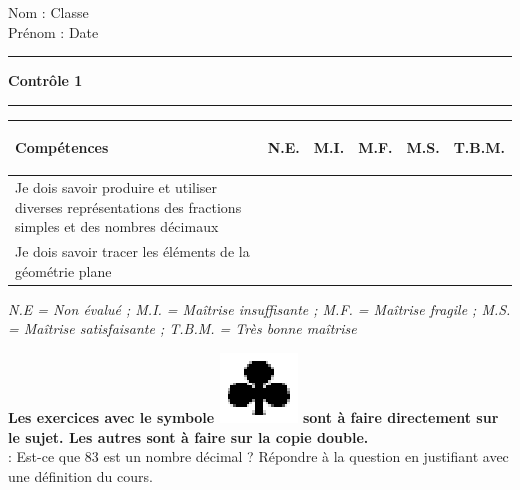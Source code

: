 \documentclass[a4paper,11pt]{article}
\newcounter{numexo}
\newcommand{\exo}[1]{\stepcounter{numexo}\noindent{\bf Exercice~\thenumexo} : \marginpar{\hfill /#1}}
\newcommand{\titre}[5] 
{
\noindent #2 \hfill #4 \\
#3 \hfill #5

\vspace{-1.6cm}

\begin{center}\rule{6cm}{0.5mm}\end{center}
\vspace{0.2cm}
\begin{center}{\large{\textbf{#1}}}\end{center}
\begin{center}\rule{6cm}{0.5mm}\end{center}
}
\begin{document}
\pagestyle{empty}
\titre{Contrôle 1  }{Nom :}{Prénom :}{Classe}{Date}


\vspace*{0.25cm}
\begin{flushleft}
\begin{tabular}{|m{9.5cm}|m{1.25cm}|m{1.25cm}|m{1.25cm}|m{1.25cm}|m{1.25cm}|}
\hline 
\textbf{Compétences} & \begin{center}
\textbf{N.E.}
\end{center} & \begin{center}
\textbf{M.I.}
\end{center} & \begin{center}
\textbf{M.F.}
\end{center}  & \begin{center}
\textbf{M.S.}
\end{center} & \begin{center}
\textbf{T.B.M.}
\end{center} \\ 
\hline 
Je dois savoir produire et utiliser diverses représentations des fractions simples et des nombres décimaux &  &  & & &\\
\hline 
Je dois savoir tracer les éléments de la géométrie plane &  &  & & &\\
\hline


\end{tabular} 
\end{flushleft}

\textit{N.E = Non évalué ; M.I. = Maîtrise insuffisante ; M.F. = Maîtrise fragile ; M.S. = Maîtrise satisfaisante ; T.B.M. = Très bonne maîtrise}\\




\vspace*{0.15cm}


\textbf{Les exercices avec le symbole \includegraphics[scale=0.4]{trefle.eps} sont à faire directement sur le sujet. Les autres sont à faire sur la copie double.}\\



\exo{2} Est-ce que 83 est un nombre décimal ? Répondre à la question en justifiant avec une définition du cours.\\
\end{document}
